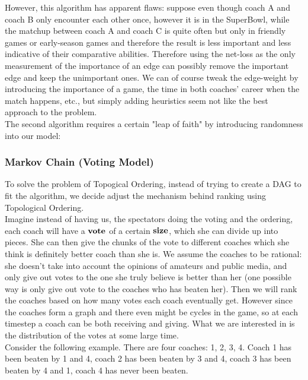\documentclass[titlepage]{article}
\begin{document}
\vspace{5mm}

\noindent However, this algorithm has apparent flaws: suppose even though coach A and coach B only encounter each other once, however it is in the SuperBowl, while the matchup between coach A and coach C is quite often but only in friendly games or early-season games and therefore the result is less important and less indicative of their comparative abilities. Therefore using the net-loss as the only measurement of the importance of an edge can possibly remove the important edge and keep the unimportant ones. We can of course tweak the edge-weight by introducing the importance of a game, the time in both coaches' career when the match happens, etc., but simply adding heuristics seem not like the best approach to the problem.
\\

\noindent The second algorithm requires a certain "leap of faith" by introducing randomness into our model:

\subsubsection{Markov Chain (Voting Model)}

To solve the problem of Topogical Ordering, instead of trying to create a DAG to fit the algorithm, we decide adjust the mechanism behind ranking using Topological Ordering.
\\

\noindent Imagine instead of having us, the spectators doing the voting and the ordering, each coach will have a $\bf{vote}$ of a certain $\bf{size}$, which she can divide up into pieces. She can then give the chunks of the vote to different coaches which she think is definitely better coach than she is. We assume the coaches to be rational: she doesn't take into account the opinions of amateurs and public media, and only give out votes to the one she truly believe is better than her (one possible way is only give out vote to the coaches who has beaten her). Then we will rank the coaches based on how many votes each coach eventually get. However since the coaches form a graph and there even might be cycles in the game, so at each timestep a coach can be both receiving and giving. What we are interested in is the distribution of the votes at some large time.
\\

\noindent Consider the following example. There are four coaches: 1, 2, 3, 4. Coach 1 has been beaten by 1 and 4, coach 2 has been beaten by 3 and 4, coach 3 has been beaten by 4 and 1, coach 4 has never been beaten.
\end{document}
